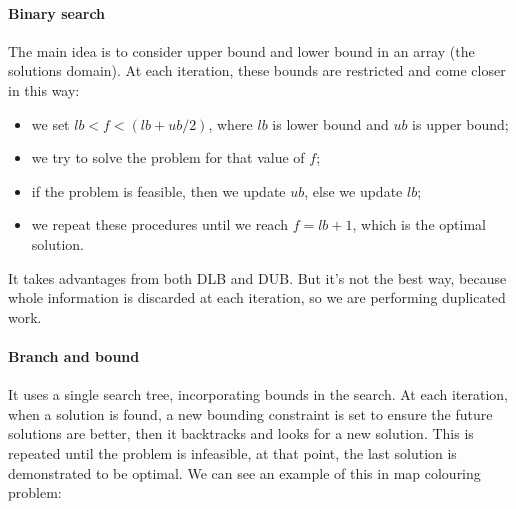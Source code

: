 \documentclass[10pt,a4paper]{article}
\begin{document}
\paragraph{Binary search}
The main idea is to consider upper bound and lower bound in an array (the
solutions domain). At each iteration, these bounds are restricted and come
closer in this way:
\begin{itemize}
    \item we set $lb < f < (lb + ub / 2)$, where $lb$ is lower bound and $ub$ is
    upper bound;
    \item we try to solve the problem for that value of $f$;
    \item if the problem is feasible, then we update $ub$, else we update $lb$;
    \item we repeat these procedures until we reach $f = lb + 1$, which is the
    optimal solution.
\end{itemize}
It takes advantages from both DLB and DUB. But it's not the best way, because
whole information is discarded at each iteration, so we are performing
duplicated work.

\paragraph{Branch and bound}
It uses a single search tree, incorporating bounds in the search. At each
iteration, when a solution is found, a new bounding constraint is set to ensure
the future solutions are better, then it backtracks and looks for a new
solution. This is repeated until the problem is infeasible, at that point, the
last solution is demonstrated to be optimal. We can see an example of this in
map colouring problem:

\end{document}
